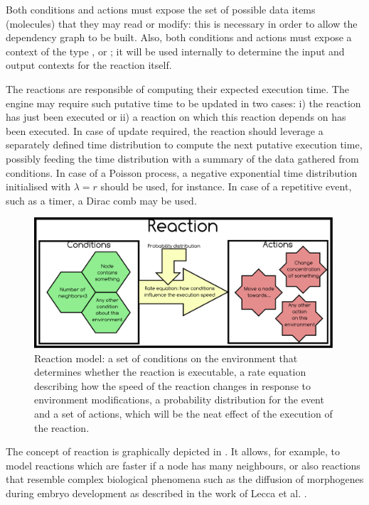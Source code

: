 \documentclass[12pt,a4paper,twoside,openright]{book}
\begin{document}
Both conditions and actions must expose the set of possible data items (molecules) that they may read or modify: this is necessary in order to allow the dependency graph to be built.
%
Also, both conditions and actions must expose a context of the type \localc{}, \neighborhood{} or \globalc{}; it will be used internally to determine the input and output contexts for the reaction itself.

The reactions are responsible of computing their expected execution time.
%
The engine may require such putative time to be updated in two cases: i) the reaction has just been executed or ii) a reaction on which this reaction depends on has been executed.
%
In case of update required, the reaction should leverage a separately defined time distribution to compute the next putative execution time, possibly feeding the time distribution with a summary of the data gathered from conditions.
%
In case of a Poisson process, a negative exponential time distribution initialised with $\lambda{} = r$ should be used, for instance.
%
In case of a repetitive event, such as a timer, a Dirac comb may be used.

\begin{figure}%
  \begin{center}
    \includegraphics[width=0.99\textwidth]{img/reaction.pdf}
    \caption[\alchemist{} model of reaction]{Reaction model: a set of conditions on the environment that determines whether the reaction is executable, a rate equation describing how the speed of the reaction changes in response to environment modifications, a probability distribution for the event and a set of actions, which will be the neat effect of the execution of the reaction.}
    \label{img:reaction}
  \end{center}
\end{figure}

The concept of reaction is graphically depicted in .
%
It allows, for example, to model reactions which are faster if a node has many neighbours, or also reactions that resemble complex biological phenomena such as the diffusion of morphogenes during embryo development as described in the work of Lecca et al. \cite{LeccaJIB2010}.
\end{document}
